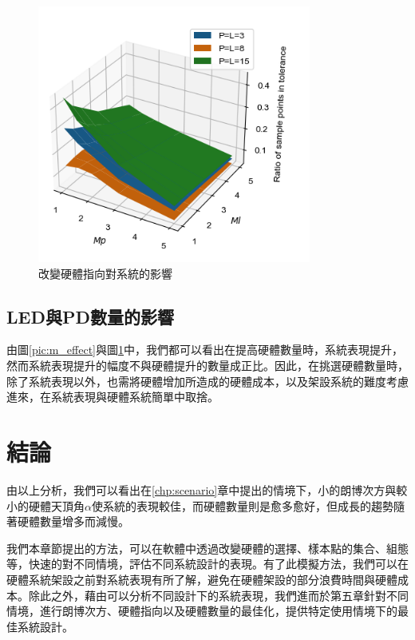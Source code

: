 \begin{figure}[h!]
    \centering
    \includegraphics[width=9cm]{ch4pic/m_effect.png}
    \caption{改變硬體指向對系統的影響}
    \label{pic:alpha_effect}
\end{figure}



\subsection{LED與PD數量的影響}

由圖\ref{pic:m_effect}與圖\ref{pic:alpha_effect}中，我們都可以看出在提高硬體數量時，系統表現提升，然而系統表現提升的幅度不與硬體提升的數量成正比。因此，在挑選硬體數量時，除了系統表現以外，也需將硬體增加所造成的硬體成本，以及架設系統的難度考慮進來，在系統表現與硬體系統簡單中取捨。

\section{結論}
\label{chp:4_conclusion}


由以上分析，我們可以看出在\ref{chp:scenario}章中提出的情境下，小的朗博次方與較小的硬體天頂角$\alpha$使系統的表現較佳，而硬體數量則是愈多愈好，但成長的趨勢隨著硬體數量增多而減慢。

我們本章節提出的方法，可以在軟體中透過改變硬體的選擇、樣本點的集合、組態等，快速的對不同情境，評估不同系統設計的表現。有了此模擬方法，我們可以在硬體系統架設之前對系統表現有所了解，避免在硬體架設的部分浪費時間與硬體成本。除此之外，藉由可以分析不同設計下的系統表現，我們進而於第五章針對不同情境，進行朗博次方、硬體指向以及硬體數量的最佳化，提供特定使用情境下的最佳系統設計。